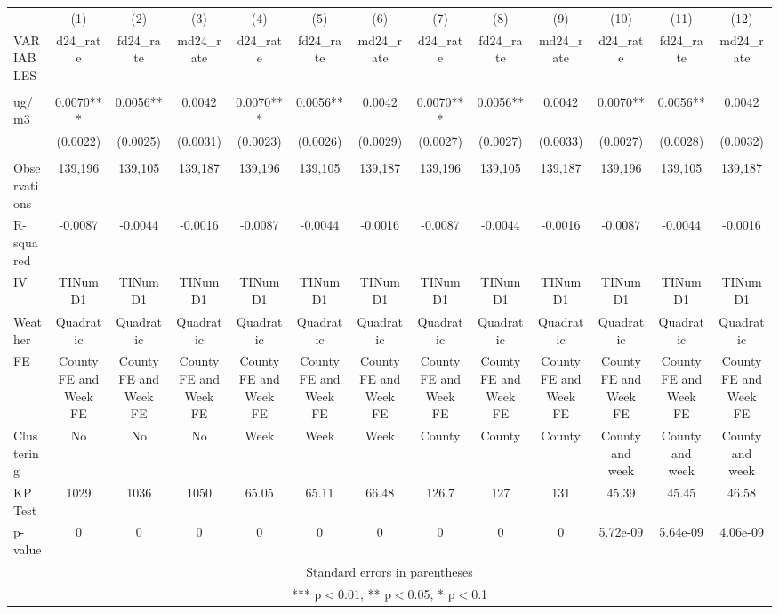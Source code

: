 \begin{tabular}{lcccccccccccc} \hline
 & (1) & (2) & (3) & (4) & (5) & (6) & (7) & (8) & (9) & (10) & (11) & (12) \\
VARIABLES & d24\_rate & fd24\_rate & md24\_rate & d24\_rate & fd24\_rate & md24\_rate & d24\_rate & fd24\_rate & md24\_rate & d24\_rate & fd24\_rate & md24\_rate \\ \hline
 &  &  &  &  &  &  &  &  &  &  &  &  \\
ug/m3 & 0.0070*** & 0.0056** & 0.0042 & 0.0070*** & 0.0056** & 0.0042 & 0.0070*** & 0.0056** & 0.0042 & 0.0070** & 0.0056** & 0.0042 \\
 & (0.0022) & (0.0025) & (0.0031) & (0.0023) & (0.0026) & (0.0029) & (0.0027) & (0.0027) & (0.0033) & (0.0027) & (0.0028) & (0.0032) \\
 &  &  &  &  &  &  &  &  &  &  &  &  \\
Observations & 139,196 & 139,105 & 139,187 & 139,196 & 139,105 & 139,187 & 139,196 & 139,105 & 139,187 & 139,196 & 139,105 & 139,187 \\
R-squared & -0.0087 & -0.0044 & -0.0016 & -0.0087 & -0.0044 & -0.0016 & -0.0087 & -0.0044 & -0.0016 & -0.0087 & -0.0044 & -0.0016 \\
IV & TINumD1 & TINumD1 & TINumD1 & TINumD1 & TINumD1 & TINumD1 & TINumD1 & TINumD1 & TINumD1 & TINumD1 & TINumD1 & TINumD1 \\
Weather & Quadratic & Quadratic & Quadratic & Quadratic & Quadratic & Quadratic & Quadratic & Quadratic & Quadratic & Quadratic & Quadratic & Quadratic \\
FE & County FE and Week FE & County FE and Week FE & County FE and Week FE & County FE and Week FE & County FE and Week FE & County FE and Week FE & County FE and Week FE & County FE and Week FE & County FE and Week FE & County FE and Week FE & County FE and Week FE & County FE and Week FE \\
Clustering & No & No & No & Week & Week & Week & County & County & County & County and week & County and week & County and week \\
KP Test & 1029 & 1036 & 1050 & 65.05 & 65.11 & 66.48 & 126.7 & 127 & 131 & 45.39 & 45.45 & 46.58 \\
 p-value & 0 & 0 & 0 & 0 & 0 & 0 & 0 & 0 & 0 & 5.72e-09 & 5.64e-09 & 4.06e-09 \\ \hline
\multicolumn{13}{c}{ Standard errors in parentheses} \\
\multicolumn{13}{c}{ *** p$<$0.01, ** p$<$0.05, * p$<$0.1} \\
\end{tabular}
